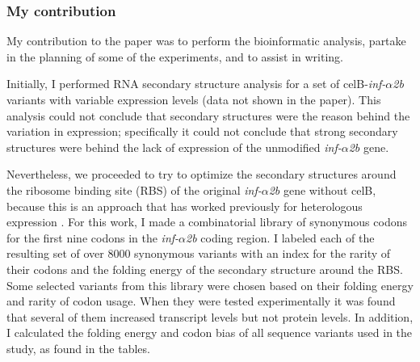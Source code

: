 \subsubsection{My contribution}
My contribution to the paper was to perform the bioinformatic analysis, partake
in the planning of some of the experiments, and to assist in writing.

Initially, I performed RNA secondary structure analysis for a set of
celB-\textit{inf-$\alpha$2b} variants with variable expression levels (data not
shown in the paper). This analysis could not conclude that secondary structures
were the reason behind the variation in expression; specifically it could not
conclude that strong secondary structures were behind the lack of expression of
the unmodified \textit{inf-$\alpha$2b} gene.

Nevertheless, we proceeded to try to optimize the secondary structures around
the ribosome binding site (RBS) of the original \textit{inf-$\alpha$2b} gene
without celB, because this is an approach that has worked previously for
heterologous expression \cite{de_smit_secondary_1990}. For this work, I made a
combinatorial library of synonymous codons for the first nine codons in the
\textit{inf-$\alpha$2b} coding region. I labeled each of the resulting set of
over 8000 synonymous variants with an index for the rarity of their codons and
the folding energy of the secondary structure around the RBS. Some selected
variants from this library were chosen based on their folding energy and rarity
of codon usage. When they were tested experimentally it was found that several
of them increased transcript levels but not protein levels. In addition, I
calculated the folding energy and codon bias of all sequence variants used in
the study, as found in the tables.
